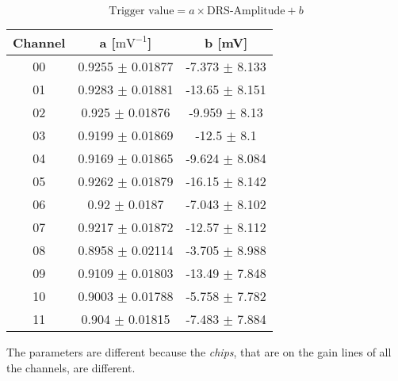 \begin{frame} [fragile]
\begin{equation*}
\text{Trigger value} =  a \times \text{DRS-Amplitude} + b
\end{equation*}

\begin{center}
\begin{tabular}{ ccc } 
 \hline
\textbf{Channel} & a  [$\text{mV}^{-1}$]& b [mV] \\ 
 \hline
 \hline
00 & 0.9255 $\pm$ 0.01877 & -7.373 $\pm$ 8.133 \\ 
01 & 0.9283 $\pm$ 0.01881 & -13.65 $\pm$ 8.151 \\
02 & 0.925   $\pm$ 0.01876 & -9.959 $\pm$ 8.13 \\
03 & 0.9199 $\pm$ 0.01869 & -12.5   $\pm$ 8.1 \\
04 & 0.9169 $\pm$ 0.01865 & -9.624 $\pm$ 8.084 \\
05 & 0.9262 $\pm$ 0.01879 & -16.15 $\pm$ 8.142 \\
06 &    0.92  $\pm$ 0.0187   & -7.043 $\pm$ 8.102 \\
07 & 0.9217 $\pm$ 0.01872 & -12.57 $\pm$ 8.112 \\
08 & 0.8958 $\pm$ 0.02114 & -3.705 $\pm$ 8.988 \\
09 & 0.9109 $\pm$ 0.01803 & -13.49 $\pm$ 7.848 \\
10 & 0.9003 $\pm$ 0.01788 & -5.758 $\pm$ 7.782 \\
11 & 0.904 $\pm$ 0.01815   & -7.483 $\pm$ 7.884 \\
  \hline
  \hline
\end{tabular}
\end{center}
The parameters are different because the \textit{chips}, that are on the gain lines of all the channels, are different.
\end{frame}
